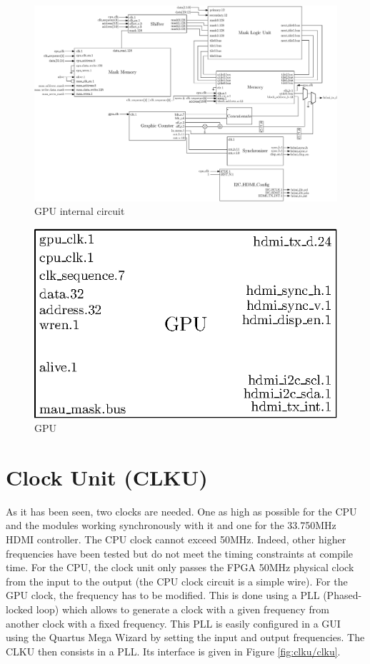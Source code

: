 \begin{figure}[H]
    \centering
    \includegraphics[width=\linewidth]{Chapter4-GPU_CLKU/res/gpu_in}
    \caption{GPU internal circuit}
    \label{fig:gpu/gpu_in}
\end{figure}

\begin{figure}[H]
    \centering
    \includegraphics[scale=1.0]{Chapter4-GPU_CLKU/res/gpu}
    \caption{GPU}
    \label{fig:gpu/gpu}
\end{figure}

\section{Clock Unit (CLKU)}

As it has been seen, two clocks are needed. One as high as possible for the CPU and the modules 
working synchronously with it and one for the 33.750MHz HDMI controller. The CPU clock cannot 
exceed 50MHz. Indeed, other higher frequencies have been tested but do not meet the timing 
constraints at compile time. For the CPU, the clock unit only passes the FPGA 50MHz physical clock 
from the input to the output (the CPU clock circuit is a simple wire). For the GPU clock, the frequency
has to be modified. This is done 
using a PLL (Phased-locked loop) which allows to generate a clock with a given frequency from 
another clock with a fixed frequency. This PLL is easily configured in a GUI using the Quartus 
Mega Wizard by setting the input and output frequencies. The CLKU then consists in a PLL. Its interface 
is given in Figure \ref{fig:clku/clku}.

